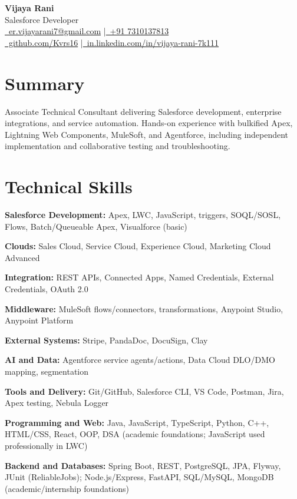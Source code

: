 \documentclass[a4paper,11pt]{article}
\begin{document}
\begin{center}
{\LARGE\bfseries Vijaya Rani}\\[3pt]
{\normalsize Salesforce Developer}\\[3pt]
\small \href{mailto:er.vijayarani7@gmail.com}{\faEnvelope\ er.vijayarani7@gmail.com} \enspace|\enspace \href{tel:+917310137813}{\faPhone\ +91 7310137813}\\[2pt]
\href{https://github.com/Kvrs16}{\faGithub\ github.com/Kvrs16} \enspace|\enspace \href{https://in.linkedin.com/in/vijaya-rani-7k111}{\faLinkedin\ in.linkedin.com/in/vijaya-rani-7k111}
\end{center}
\section{Summary}
Associate Technical Consultant delivering Salesforce development, enterprise integrations, and service automation. Hands-on experience with bulkified Apex, Lightning Web Components, MuleSoft, and Agentforce, including independent implementation and collaborative testing and troubleshooting.\par
\section{Technical Skills}
\textbf{Salesforce Development:} Apex, LWC, JavaScript, triggers, SOQL/SOSL, Flows, Batch/Queueable Apex, Visualforce (basic)\par
\textbf{Clouds:} Sales Cloud, Service Cloud, Experience Cloud, Marketing Cloud Advanced\par
\textbf{Integration:} REST APIs, Connected Apps, Named Credentials, External Credentials, OAuth 2.0\par
\textbf{Middleware:} MuleSoft flows/connectors, transformations, Anypoint Studio, Anypoint Platform\par
\textbf{External Systems:} Stripe, PandaDoc, DocuSign, Clay\par
\textbf{AI and Data:} Agentforce service agents/actions, Data Cloud DLO/DMO mapping, segmentation\par
\textbf{Tools and Delivery:} Git/GitHub, Salesforce CLI, VS Code, Postman, Jira, Apex testing, Nebula Logger\par
\textbf{Programming and Web:} Java, JavaScript, TypeScript, Python, C++, HTML/CSS, React, OOP, DSA (academic foundations; JavaScript used professionally in LWC)\par
\textbf{Backend and Databases:} Spring Boot, REST, PostgreSQL, JPA, Flyway, JUnit (ReliableJobs); Node.js/Express, FastAPI, SQL/MySQL, MongoDB (academic/internship foundations)\par
\end{document}
